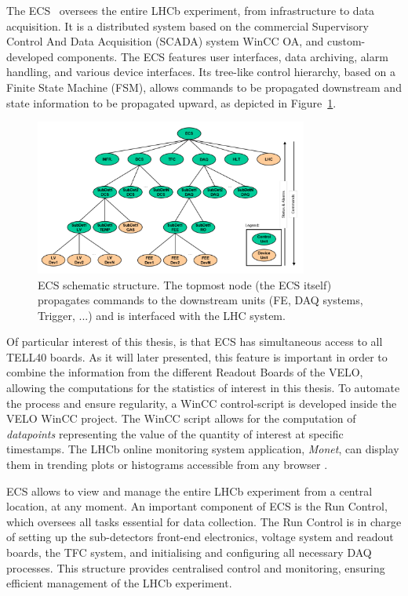 The ECS~\cite{GranadoCardoso:2702137} oversees the entire LHCb experiment, from infrastructure to data acquisition. It is a distributed system based on the commercial Supervisory Control And Data Acquisition (SCADA) system WinCC OA, and custom-developed components. The ECS features user interfaces, data archiving, alarm handling, and various device interfaces. Its tree-like control hierarchy, based on a Finite State Machine (FSM), allows commands to be propagated downstream and state information to be propagated upward, as depicted in Figure~\ref{fig:ECS_tree}.
\begin{figure}
    \centering
    \includegraphics[width=0.8\textwidth]{figures/ECS_tree.png}
    \caption{ECS schematic structure. The topmost node (the ECS itself) propagates commands to the downstream units (FE, DAQ systems, Trigger, ...) and is interfaced with the LHC system.}
    \label{fig:ECS_tree}
\end{figure}

Of particular interest of this thesis, is that ECS has simultaneous access to all TELL40 boards. As it will later presented, this feature is important in order to combine the information from the different Readout Boards of the VELO, allowing the computations for the statistics of interest in this thesis. To automate the process and ensure regularity, a WinCC control-script is developed inside the VELO WinCC project. The WinCC script allows for the computation of \textit{datapoints} representing the value of the quantity of interest at specific timestamps. The LHCb online monitoring system application, \textit{Monet}, can display them in trending plots or histograms accessible from any browser \cite{Adinolfi:2298467}.

ECS allows to view and manage the entire LHCb experiment from a central location, at any moment. An important component of ECS is the Run Control, which oversees all tasks essential for data collection. The Run Control is in charge of setting up the sub-detectors front-end electronics, voltage system and readout boards, the TFC system, and initialising and configuring all necessary DAQ processes. 
This structure provides centralised control and monitoring, ensuring efficient management of the LHCb experiment.